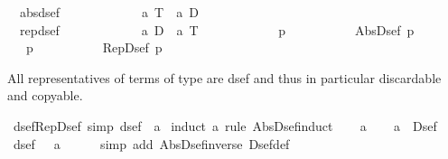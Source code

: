 \begin{isabellebody}
\isanewline
\ \ {\isachardoublequote}{\isacharunderscore}absdsef{\isachardoublequote}\ \ \ \ \ \ \ \ \ \ \ \ {\isacharcolon}{\isacharcolon}\ {\isachardoublequote}{\isacharprime}a\ T\ {\isasymRightarrow}\ {\isacharprime}a\ D{\isachardoublequote}\ \ \ \ \ \ {\isacharparenleft}{\isachardoublequote}{\isasymUp}\ {\isacharunderscore}{\isachardoublequote}\ {\isacharbrackleft}{}{}{}{\isacharbrackright}\ {}{}{}{\isacharparenright}\isanewline
\ \ {\isachardoublequote}{\isacharunderscore}repdsef{\isachardoublequote}\ \ \ \ \ \ \ \ \ \ \ \ {\isacharcolon}{\isacharcolon}\ {\isachardoublequote}{\isacharprime}a\ D\ {\isasymRightarrow}\ {\isacharprime}a\ T{\isachardoublequote}\ \ \ \ \ \ {\isacharparenleft}{\isachardoublequote}{\isasymDown}\ {\isacharunderscore}{\isachardoublequote}\ {\isacharbrackleft}{}{}{}{\isacharbrackright}\ {}{}{}{\isacharparenright}\isanewline
\isamarkupfalse%
\isanewline
\ \ {\isachardoublequote}{\isasymUp}\ p{\isachardoublequote}\ \ \ \ \ \ {\isasymrightleftharpoons}\ \ \ \ \ {\isachardoublequote}Abs{\isacharunderscore}Dsef\ p{\isachardoublequote}\isanewline
\ \ {\isachardoublequote}{\isasymDown}\ p{\isachardoublequote}\ \ \ \ \ \ {\isasymrightleftharpoons}\ \ \ \ \ {\isachardoublequote}Rep{\isacharunderscore}Dsef\ p{\isachardoublequote}\isamarkupfalse%
%
\begin{isamarkuptext}%
All representatives of terms of type  are dsef and thus in 
        particular discardable and copyable.%
\end{isamarkuptext}%
\isamarkuptrue%
\ dsef{\isacharunderscore}Rep{\isacharunderscore}Dsef\ {\isacharbrackleft}simp{\isacharbrackright}{\isacharcolon}\ {\isachardoublequote}dsef\ {\isacharparenleft}{\isasymDown}\ a{\isacharparenright}{\isachardoublequote}\isanewline
\isamarkupfalse%
\ {\isacharparenleft}induct\ a\ rule{\isacharcolon}\ Abs{\isacharunderscore}Dsef{\isacharunderscore}induct{\isacharparenright}\isanewline
\ \ \isamarkupfalse%
\ a\isanewline
\ \ \isamarkupfalse%
\ {\isachardoublequote}a\ {\isacharcolon}\ Dsef{\isachardoublequote}\isanewline
\ \ \isamarkupfalse%
\ {\isachardoublequote}dsef\ {\isacharparenleft}{\isasymDown}\ {\isacharparenleft}{\isasymUp}\ a{\isacharparenright}{\isacharparenright}{\isachardoublequote}\isanewline
\ \ \ \ \isamarkupfalse%
\ {\isacharparenleft}simp\ add{\isacharcolon}\ Abs{\isacharunderscore}Dsef{\isacharunderscore}inverse\ Dsef{\isacharunderscore}def{\isacharparenright}\isanewline

\end{isabellebody}
